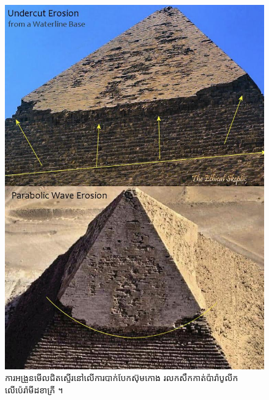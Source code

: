 \documentclass[10pt,twocolumn,letterpaper]{article}
\begin{document}
\begin{figure}[H]
\begin{center}
   \includegraphics[width=1\linewidth]{wave.jpg}
\end{center}
   \caption{ការអង្រួនមើលជិតស្ទើរនៅលើការបាក់បែកស៊ុមកោង រលកសឹកកាត់ប៉ារ៉ាបូលីក លើប៉េរ៉ាមីដខាភ្រី \cite{27}។}
\label{fig:19}
\label{fig:onecol}
\end{figure}
\end{document}
